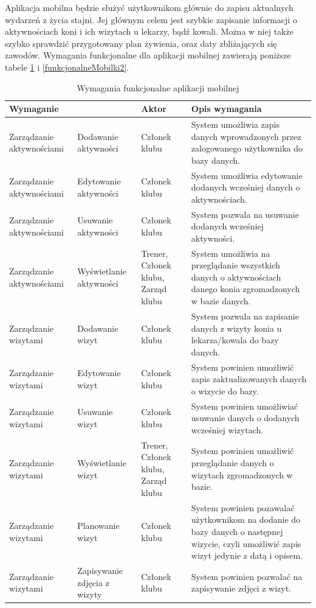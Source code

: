 \documentclass[12pt,twoside]{report}
\begin{document}
Aplikacja mobilna będzie służyć użytkownikom głównie do zapisu aktualnych wydarzeń z życia stajni. Jej głównym celem jest szybkie zapisanie informacji o aktywnościach koni i ich wizytach u lekarzy, bądź kowali. Można w niej także szybko sprawdzić przygotowany plan żywienia, oraz daty zbliżających się zawodów.
Wymagania funkcjonalne dla aplikacji mobilnej zawierają poniższe tabele \ref{funkcjonalneMobilki1} i \ref{funkcjonalneMobilki2}.
\begin{table}[H]
	\centering
	\begin{tabular}{|p{3cm}|p{3cm}|p{3cm}|p{6cm}|}			
		\hline
	   \multicolumn{2}{|l|}{Wymaganie} & Aktor & Opis wymagania\\
		\hline
		Zarządzanie aktywnościami & Dodawanie aktywności & Członek klubu &  System umożliwia zapis danych wprowadzonych przez zalogowanego użytkownika do bazy danych.\\	
		\hline	
		Zarządzanie aktywnościami & Edytowanie aktywności & Członek klubu & System umożliwia edytowanie dodanych wcześniej danych o aktywnościach. \\	
		\hline	
		Zarządzanie aktywnościami& Usuwanie aktywności & Członek klubu & System pozwala na usuwanie dodanych wcześniej aktywności. \\
		\hline
		Zarządzanie aktywnościami& Wyświetlanie aktywności & Trener, Członek klubu, Zarząd klubu& System umożliwia na przeglądanie wszystkich danych o aktywnościach danego konia zgromadzonych w bazie danych.\\
		\hline
		Zarządzanie wizytami & Dodawanie wizyt & Członek klubu& System pozwala na zapisanie danych z wizyty konia u lekarza/kowala do bazy danych.\\
		\hline
		Zarządzanie wizytami & Edytowanie wizyt & Członek klubu& System powinien umożliwić zapis zaktualizowanych danych o wizycie do bazy.\\
		\hline
		Zarządzanie wizytami & Usuwanie wizyt & Członek klubu & System powinien umożliwiać usuwanie danych o dodanych wcześniej wizytach.\\
		\hline 
		Zarządzanie wizytami & Wyświetlanie wizyt & Trener, Członek klubu, Zarząd klubu& System powinien umożliwić przeglądanie danych o wizytach zgromadzonych w bazie.\\
		\hline
		Zarządzanie wizytami & Planowanie wizyt & Członek klubu & System powinien pozawalać użytkownikom na dodanie do bazy danych o następnej wizycie, czyli umożliwić zapis wizyt jedynie z datą i opisem.\\
		\hline
		Zarządzanie wizytami & Zapisywanie zdjęcia z wizyty & Członek klubu&System powinien pozwalać na zapisywanie zdjęci z wizyt.\\
		\hline
	\end{tabular}
	\caption{Wymagania funkcjonalne aplikacji mobilnej}
	\label{funkcjonalneMobilki1}
\end{table}
\end{document}
